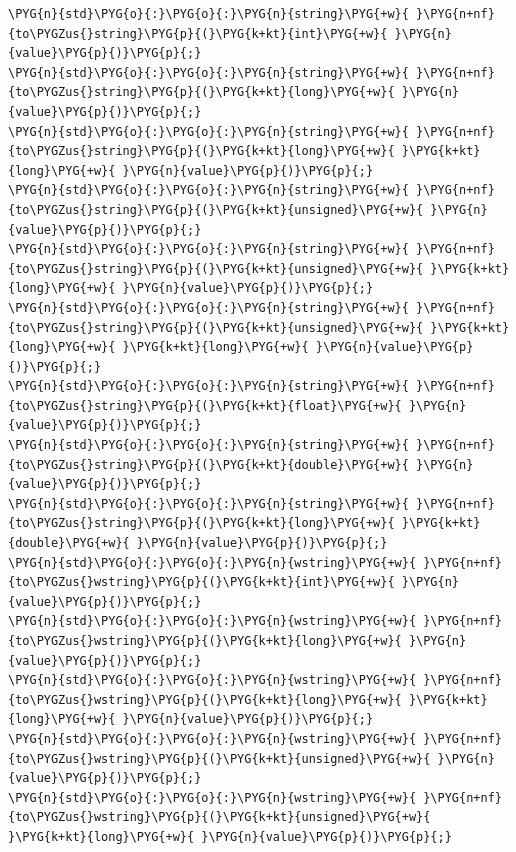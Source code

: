 \begin{codeblockbg}
\begin{Verbatim}[commandchars=\\\{\},breaklines=true,breakanywhere=true,fontsize=\codefont,xleftmargin=17bp]
\PYG{n}{std}\PYG{o}{:}\PYG{o}{:}\PYG{n}{string}\PYG{+w}{ }\PYG{n+nf}{to\PYGZus{}string}\PYG{p}{(}\PYG{k+kt}{int}\PYG{+w}{ }\PYG{n}{value}\PYG{p}{)}\PYG{p}{;}
\PYG{n}{std}\PYG{o}{:}\PYG{o}{:}\PYG{n}{string}\PYG{+w}{ }\PYG{n+nf}{to\PYGZus{}string}\PYG{p}{(}\PYG{k+kt}{long}\PYG{+w}{ }\PYG{n}{value}\PYG{p}{)}\PYG{p}{;}
\PYG{n}{std}\PYG{o}{:}\PYG{o}{:}\PYG{n}{string}\PYG{+w}{ }\PYG{n+nf}{to\PYGZus{}string}\PYG{p}{(}\PYG{k+kt}{long}\PYG{+w}{ }\PYG{k+kt}{long}\PYG{+w}{ }\PYG{n}{value}\PYG{p}{)}\PYG{p}{;}
\PYG{n}{std}\PYG{o}{:}\PYG{o}{:}\PYG{n}{string}\PYG{+w}{ }\PYG{n+nf}{to\PYGZus{}string}\PYG{p}{(}\PYG{k+kt}{unsigned}\PYG{+w}{ }\PYG{n}{value}\PYG{p}{)}\PYG{p}{;}
\PYG{n}{std}\PYG{o}{:}\PYG{o}{:}\PYG{n}{string}\PYG{+w}{ }\PYG{n+nf}{to\PYGZus{}string}\PYG{p}{(}\PYG{k+kt}{unsigned}\PYG{+w}{ }\PYG{k+kt}{long}\PYG{+w}{ }\PYG{n}{value}\PYG{p}{)}\PYG{p}{;}
\PYG{n}{std}\PYG{o}{:}\PYG{o}{:}\PYG{n}{string}\PYG{+w}{ }\PYG{n+nf}{to\PYGZus{}string}\PYG{p}{(}\PYG{k+kt}{unsigned}\PYG{+w}{ }\PYG{k+kt}{long}\PYG{+w}{ }\PYG{k+kt}{long}\PYG{+w}{ }\PYG{n}{value}\PYG{p}{)}\PYG{p}{;}
\PYG{n}{std}\PYG{o}{:}\PYG{o}{:}\PYG{n}{string}\PYG{+w}{ }\PYG{n+nf}{to\PYGZus{}string}\PYG{p}{(}\PYG{k+kt}{float}\PYG{+w}{ }\PYG{n}{value}\PYG{p}{)}\PYG{p}{;}
\PYG{n}{std}\PYG{o}{:}\PYG{o}{:}\PYG{n}{string}\PYG{+w}{ }\PYG{n+nf}{to\PYGZus{}string}\PYG{p}{(}\PYG{k+kt}{double}\PYG{+w}{ }\PYG{n}{value}\PYG{p}{)}\PYG{p}{;}
\PYG{n}{std}\PYG{o}{:}\PYG{o}{:}\PYG{n}{string}\PYG{+w}{ }\PYG{n+nf}{to\PYGZus{}string}\PYG{p}{(}\PYG{k+kt}{long}\PYG{+w}{ }\PYG{k+kt}{double}\PYG{+w}{ }\PYG{n}{value}\PYG{p}{)}\PYG{p}{;}
\PYG{n}{std}\PYG{o}{:}\PYG{o}{:}\PYG{n}{wstring}\PYG{+w}{ }\PYG{n+nf}{to\PYGZus{}wstring}\PYG{p}{(}\PYG{k+kt}{int}\PYG{+w}{ }\PYG{n}{value}\PYG{p}{)}\PYG{p}{;}
\PYG{n}{std}\PYG{o}{:}\PYG{o}{:}\PYG{n}{wstring}\PYG{+w}{ }\PYG{n+nf}{to\PYGZus{}wstring}\PYG{p}{(}\PYG{k+kt}{long}\PYG{+w}{ }\PYG{n}{value}\PYG{p}{)}\PYG{p}{;}
\PYG{n}{std}\PYG{o}{:}\PYG{o}{:}\PYG{n}{wstring}\PYG{+w}{ }\PYG{n+nf}{to\PYGZus{}wstring}\PYG{p}{(}\PYG{k+kt}{long}\PYG{+w}{ }\PYG{k+kt}{long}\PYG{+w}{ }\PYG{n}{value}\PYG{p}{)}\PYG{p}{;}
\PYG{n}{std}\PYG{o}{:}\PYG{o}{:}\PYG{n}{wstring}\PYG{+w}{ }\PYG{n+nf}{to\PYGZus{}wstring}\PYG{p}{(}\PYG{k+kt}{unsigned}\PYG{+w}{ }\PYG{n}{value}\PYG{p}{)}\PYG{p}{;}
\PYG{n}{std}\PYG{o}{:}\PYG{o}{:}\PYG{n}{wstring}\PYG{+w}{ }\PYG{n+nf}{to\PYGZus{}wstring}\PYG{p}{(}\PYG{k+kt}{unsigned}\PYG{+w}{ }\PYG{k+kt}{long}\PYG{+w}{ }\PYG{n}{value}\PYG{p}{)}\PYG{p}{;}

\end{Verbatim}
\end{codeblockbg}
